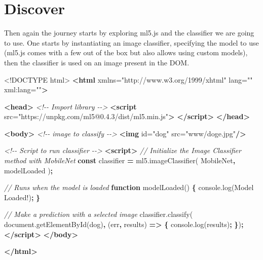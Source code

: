 \documentclass[
]{krantz}
\makeatletter
\newenvironment{Shaded}{\begin{snugshade}}{\end{snugshade}}
\newcommand{\AttributeTok}[1]{\textcolor[rgb]{0.61,0.61,0.61}{#1}}
\newcommand{\CommentTok}[1]{\textcolor[rgb]{0.37,0.37,0.37}{\textit{#1}}}
\newcommand{\DataTypeTok}[1]{\textcolor[rgb]{0.27,0.27,0.27}{#1}}
\newcommand{\KeywordTok}[1]{\textcolor[rgb]{0.27,0.27,0.27}{\textbf{#1}}}
\newcommand{\NormalTok}[1]{#1}
\newcommand{\OperatorTok}[1]{\textcolor[rgb]{0.43,0.43,0.43}{\textbf{#1}}}
\newcommand{\OtherTok}[1]{\textcolor[rgb]{0.37,0.37,0.37}{#1}}
\newcommand{\StringTok}[1]{\textcolor[rgb]{0.5,0.5,0.5}{#1}}
\newcommand{\VariableTok}[1]{\textcolor[rgb]{0,0,0}{#1}}
\newenvironment{kframe}{%
\medskip{}
\setlength{\fboxsep}{.8em}
 \def\at@end@of@kframe{}%
 \ifinner\ifhmode%
  \def\at@end@of@kframe{\end{minipage}}%
  \begin{minipage}{\columnwidth}%
 \fi\fi%
 \def\FrameCommand##1{\hskip\@totalleftmargin \hskip-\fboxsep
 \colorbox{shadecolor}{##1}\hskip-\fboxsep
     \hskip-\linewidth \hskip-\@totalleftmargin \hskip\columnwidth}%
 \MakeFramed {\advance\hsize-\width
   \@totalleftmargin\z@ \linewidth\hsize
   \@setminipage}}%
 {\par\unskip\endMakeFramed%
 \at@end@of@kframe}
\renewenvironment{Shaded}{\begin{kframe}}{\end{kframe}}
\makeatother
\begin{document}
\hypertarget{v8-img-discover}{%
\section{Discover}\label{v8-img-discover}}

Then again the journey starts by exploring ml5.js and the classifier we are going to use. One starts by instantiating an image classifier, specifying the model to use (ml5.js comes with a few out of the box but also allows using custom models), then the classifier is used on an image present in the DOM.

\begin{Shaded}
\begin{Highlighting}[]
\DataTypeTok{<!DOCTYPE }\NormalTok{html}\DataTypeTok{>}
\KeywordTok{<html}\OtherTok{ xmlns=}\StringTok{"http://www.w3.org/1999/xhtml"}\OtherTok{ lang=}\StringTok{""}\OtherTok{ xml:lang=}\StringTok{""}\KeywordTok{>}

\KeywordTok{<head>}
  \CommentTok{<!{-}{-} Import library {-}{-}>}
  \KeywordTok{<script} 
\OtherTok{    src=}\StringTok{"https://unpkg.com/ml5@0.4.3/dist/ml5.min.js"}\KeywordTok{>}
  \KeywordTok{</script>}
\KeywordTok{</head>}

\KeywordTok{<body>}
  \CommentTok{<!{-}{-} image to classify {-}{-}>}
  \KeywordTok{<img}\OtherTok{ id=}\StringTok{"dog"}\OtherTok{ src=}\StringTok{"www/doge.jpg"}\KeywordTok{/>}

  \CommentTok{<!{-}{-} Script to run classifier {-}{-}>}
  \KeywordTok{<script>}
    \CommentTok{// Initialize the Image Classifier method with MobileNet}
    \KeywordTok{const}\NormalTok{ classifier }\OperatorTok{=} \VariableTok{ml5}\NormalTok{.}\AttributeTok{imageClassifier}\NormalTok{(}
      \StringTok{\textquotesingle{}MobileNet\textquotesingle{}}\OperatorTok{,}\NormalTok{ modelLoaded}
\NormalTok{    )}\OperatorTok{;}

    \CommentTok{// Runs when the model is loaded}
    \KeywordTok{function} \AttributeTok{modelLoaded}\NormalTok{() }\OperatorTok{\{}
      \VariableTok{console}\NormalTok{.}\AttributeTok{log}\NormalTok{(}\StringTok{\textquotesingle{}Model Loaded!\textquotesingle{}}\NormalTok{)}\OperatorTok{;}
    \OperatorTok{\}}

    \CommentTok{// Make a prediction with a selected image}
    \VariableTok{classifier}\NormalTok{.}\AttributeTok{classify}\NormalTok{(}
      \VariableTok{document}\NormalTok{.}\AttributeTok{getElementById}\NormalTok{(}\StringTok{\textquotesingle{}dog\textquotesingle{}}\NormalTok{)}\OperatorTok{,}\NormalTok{ (err}\OperatorTok{,}\NormalTok{ results) }\KeywordTok{=>} \OperatorTok{\{}
        \VariableTok{console}\NormalTok{.}\AttributeTok{log}\NormalTok{(results)}\OperatorTok{;}
    \OperatorTok{\}}\NormalTok{)}\OperatorTok{;}
  \KeywordTok{</script>}
\KeywordTok{</body>}

\KeywordTok{</html>}
\end{Highlighting}
\end{Shaded}
\end{document}
